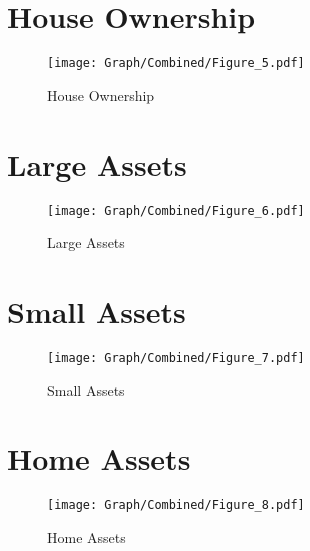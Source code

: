 \documentclass[10pt,a4paper]{article}
\begin{document}
\section{House Ownership}
\begin{table}[H]\centering

\end{table}
\begin{figure}[H]\centering
\texttt{[image: Graph/Combined/Figure\_5.pdf]}
\caption{House Ownership} \label{fig:Fig_5}
\end{figure}
\begin{table}[H]\centering

\end{table}
\section{Large Assets}
\begin{table}[H]\centering

\end{table}
\begin{figure}[H]\centering
\texttt{[image: Graph/Combined/Figure\_6.pdf]}
\caption{Large Assets} \label{fig:Fig_6}
\end{figure}
\begin{table}[H]\centering

\end{table}
\section{Small Assets}
\begin{table}[H]\centering

\end{table}
\begin{figure}[H]\centering
\texttt{[image: Graph/Combined/Figure\_7.pdf]}
\caption{Small Assets} \label{fig:Fig_7}
\end{figure}
\begin{table}[H]\centering

\end{table}
\section{Home Assets}
\begin{table}[H]\centering

\end{table}
\begin{figure}[H]\centering
\texttt{[image: Graph/Combined/Figure\_8.pdf]}
\caption{Home Assets} \label{fig:Fig_8}
\end{figure}
\begin{table}[H]\centering

\end{table}
\end{document}
